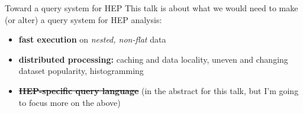 \documentclass{beamer}
\begin{document}








\begin{frame}{Toward a query system for HEP}
\vspace{0.5 cm}
\large This talk is about what we would need to make (or alter) a query system for HEP analysis:

\vspace{0.3 cm}
\begin{itemize}\setlength{\itemsep}{0.3 cm}
\item {\bf fast execution} on {\it nested, non-flat} data
\item {\bf distributed processing:} caching and data locality, uneven and changing dataset popularity, histogramming
\item \sout{{\bf HEP-specific query language}} (in the abstract for this talk, but I'm going to focus more on the above)
\end{itemize}
\end{frame}
\end{document}

